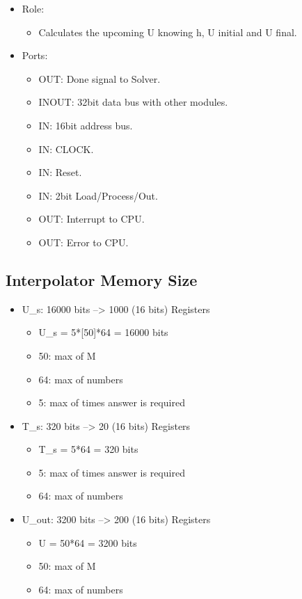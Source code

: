 \documentclass[12pt]{report}
\begin{document}
\begin{itemize}
    \item Role:
    \begin{itemize}
        \item Calculates the upcoming U knowing h, U initial and U final.
    \end{itemize}
    \item Ports:
    \begin{itemize}
        \item OUT: Done signal to Solver.
        \item INOUT: 32bit data bus with other modules.
        \item IN: 16bit address bus.
        \item IN: CLOCK.
        \item IN: Reset.
        \item IN: 2bit Load/Process/Out.
        \item OUT: Interrupt to CPU.
        \item OUT: Error to CPU.
    \end{itemize}
\end{itemize}

\subsection{Interpolator Memory Size}
\begin{itemize}
    \item U\_s: 16000 bits --> 1000 (16 bits) Registers
    \begin{itemize}
        \item U\_s = 5*[50]*64 = 16000 bits
        \item 50: max of M
        \item 64: max of numbers
        \item 5: max of times answer is required
    \end{itemize}
    \item T\_s: 320 bits --> 20 (16 bits) Registers
    \begin{itemize}
        \item T\_s = 5*64 = 320 bits
        \item 5: max of times answer is required
        \item 64: max of numbers
    \end{itemize}
    \item U\_out: 3200 bits --> 200 (16 bits) Registers
    \begin{itemize}
        \item U = 50*64 = 3200 bits
        \item 50: max of M
        \item 64: max of numbers
    \end{itemize}
\end{itemize}
\end{document}
